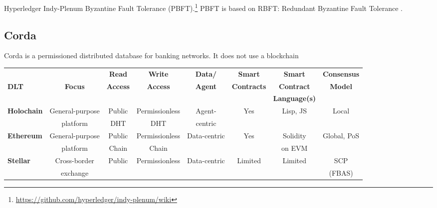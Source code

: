 Hyperledger Indy-Plenum Byzantine Fault Tolerance (PBFT).\footnote{\url{https://github.com/hyperledger/indy-plenum/wiki}} PBFT is based on RBFT: Redundant Byzantine Fault Tolerance
\cite{Aublinetal2013}.



\subsection{Corda}
Corda \cite{Hearn2016} is a permissioned distributed database for banking networks. It does not use a blockchain


\begin{table}
\small
\begin{centering}
{\begin{tabular}{| l | c | c | c | c | c | c | c |}
\hline
				& 				& \textbf{Read}			& \textbf{Write}		& \textbf{Data/} 
				& \textbf{Smart}		& \textbf{Smart}			&\textbf{Consensus}\\
\textbf{DLT}		&\textbf{Focus}  	& \textbf{Access} 		& \textbf{Access}	& \textbf{Agent} 
				& \textbf{Contracts} 	& \textbf{Contract}		&\textbf{Model} \\
				& 				& \textbf{} 				& \textbf{} 			& \textbf{} 
				& \textbf{} 			& \textbf{Language(s)}	&\textbf{}  \\
\hline
\hline
\textbf{Holochain}	&General-purpose 			&Public		&Permissionless	&Agent-	&Yes		&Lisp, JS
				&Local 				\\
				&platform 					&DHT		&DHT			&centric	&		&
				& 					\\
\hline
\textbf{Ethereum}	&General-purpose		&Public		&Permissionless	&Data-centric	&Yes		&Solidity	
				&Global, PoS 			 \\
				&platform 				&Chain		&Chain			&			&		&on EVM	
				& 					 \\
\hline
\textbf{Stellar}		&Cross-border 					&Public		&Permissionless	&Data-centric	&Limited	&Limited
				&SCP 				\\
				&exchange 					&			&				&			&		&
				&(FBAS)				\\
\hline


\end{tabular}}
\end{centering}
\end{table}
